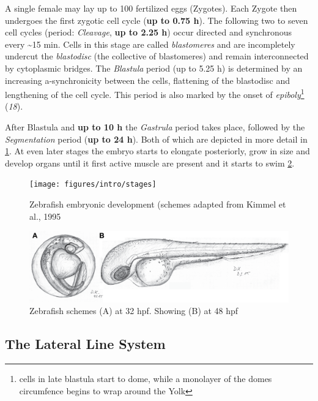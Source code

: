 \documentclass[11pt,singlespacinge,twoside]{reedthesis} %
\begin{document}
A single female may lay up to 100 fertilized eggs (Zygotes). Each Zygote then undergoes the first zygotic cell cycle (\textbf{up to 0.75 h}). The following two to seven cell cycles (period: \emph{Cleavage}, \textbf{up to 2.25 h}) occur directed and synchronous every \textasciitilde{}15 min. Cells in this stage are called \emph{blastomeres} and are incompletely undercut the \emph{blastodisc} (the collective of blastomeres) and remain interconnected by cytoplasmic bridges. The \emph{Blastula} period (up to 5.25 h) is determined by an increasing a-synchronicity between the cells, flattening of the blastodisc and lengthening of the cell cycle. This period is also marked by the onset of \emph{epiboly}\footnote{cells in late blastula start to dome, while a monolayer of the domes circumfence begins to wrap around the Yolk} (\emph{18}).

After Blastula and \textbf{up to 10 h} the \emph{Gastrula} period takes place, followed by the \emph{Segmentation} period (\textbf{up to 24 h}). Both of which are depicted in more detail in \ref{fig:stages1}. At even later stages the embryo starts to elongate posteriorly, grow in size and develop organs until it first active muscle are present and it starts to swim \ref{fig:stages2}.
\begin{figure}

{\centering \texttt{[image: figures/intro/stages]} 

}

\caption{Zebrafish embryonic development (schemes adapted from Kimmel et al., 1995}\label{fig:stages1}
\end{figure}
\begin{figure}

{\centering \includegraphics[width=.95\textwidth]{figures/intro/cldnblyngfpt_1} 

}

\caption{Zebrafish schemes (A) at 32 hpf. Showing (B) at 48 hpf}\label{fig:stages2}
\end{figure}
\hypertarget{the-lateral-line-system}{%
\subsection{The Lateral Line System}\label{the-lateral-line-system}}
\end{document}
